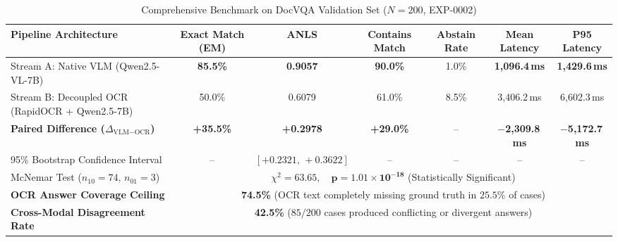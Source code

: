 \documentclass[conference]{IEEEtran}
\begin{document}
{\begin{table}[!t]
\caption{Comprehensive Benchmark on DocVQA Validation Set ($N = 200$, EXP-0002)}
\label{tab:main_results}
\begin{center}
\begin{tabular}{lcccccc}
\toprule
\textbf{Pipeline Architecture} & \textbf{Exact Match (EM)} & \textbf{ANLS} & \textbf{Contains Match} & \textbf{Abstain Rate} & \textbf{Mean Latency} & \textbf{P95 Latency} \\
\midrule
Stream A: Native VLM (Qwen2.5-VL-7B) & \textbf{85.5\%} & \textbf{0.9057} & \textbf{90.0\%} & 1.0\% & \textbf{1,096.4\,ms} & \textbf{1,429.6\,ms} \\
Stream B: Decoupled OCR (RapidOCR + Qwen2.5-7B) & 50.0\% & 0.6079 & 61.0\% & 8.5\% & 3,406.2\,ms & 6,602.3\,ms \\
\midrule
\textbf{Paired Difference ($\Delta_{\text{VLM} - \text{OCR}}$)} & \textbf{+35.5\%} & \textbf{+0.2978} & \textbf{+29.0\%} & -- & \textbf{$-$2,309.8\,ms} & \textbf{$-$5,172.7\,ms} \\
95\% Bootstrap Confidence Interval & -- & $[+0.2321, \, +0.3622]$ & -- & -- & -- & -- \\
McNemar Test ($n_{10} = 74, \, n_{01} = 3$) & \multicolumn{6}{c}{$\chi^2 = 63.65, \quad \mathbf{p = 1.01 \times 10^{-18}}$ (Statistically Significant)} \\
\midrule
\textbf{OCR Answer Coverage Ceiling} & \multicolumn{6}{c}{\textbf{74.5\%} (OCR text completely missing ground truth in $25.5\%$ of cases)} \\
\textbf{Cross-Modal Disagreement Rate} & \multicolumn{6}{c}{\textbf{42.5\%} ($85 / 200$ cases produced conflicting or divergent answers)} \\
\bottomrule
\end{tabular}
\end{center}
\end{table}

}
\end{document}

